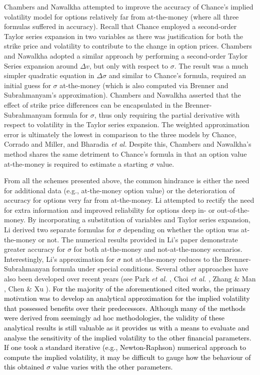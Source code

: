 Chambers and Nawalkha attempted to improve the accuracy of Chance's implied volatility model for options relatively far from at-the-money (where all three formulas suffered in accuracy). Recall that Chance employed a second-order Taylor series expansion in two variables as there was justification for both the strike price and volatility to contribute to the change in option prices. Chambers and Nawalkha adopted a similar approach by performing a second-order Taylor Series expansion around $\Delta v$, but only with respect to $\sigma$. The result was a much simpler quadratic equation in $\Delta \sigma$ and similar to Chance's formula, required an initial guess for $\sigma$ at-the-money (which is also computed via Brenner and Subrahmanyam's approximation). Chambers and Nawalkha asserted that the effect of strike price differences can be encapsulated in the Brenner-Subrahmanyam formula for $\sigma$, thus only requiring the partial derivative with respect to volatility in the Taylor series expansion. The weighted approximation error is ultimately the lowest in comparison to the three models by Chance, Corrado and Miller, and Bharadia \emph{et al.} Despite this, Chambers and Nawalkha's method shares the same detriment to Chance's formula in that an option value at-the-money is required to estimate a starting $\sigma$ value.

From all the schemes presented above, the common hindrance is either the need for additional data (e.g., at-the-money option value) or the deterioration of accuracy for options very far from at-the-money. Li \cite{SLi2005} attempted to rectify the need for extra information and improved reliability for options deep in- or out-of-the-money. By incorporating a substitution of variables and Taylor series expansion, Li derived two separate formulas for $\sigma$ depending on whether the option was at-the-money or not. The numerical results provided in Li's paper demonstrate greater accuracy for $\sigma$ for both at-the-money and not-at-the-money scenarios. Interestingly, Li's approximation for $\sigma$ not at-the-money reduces to the Brenner-Subrahmanyan formula under special conditions. Several other approaches have also been developed over recent years (see Park \emph{et al.} \cite{Park2011}, Choi \emph{et al.} \cite{Choi2011}, Zhang \& Man \cite{Zhang2014}, Chen \& Xu \cite{Chen2014}).
\textcolor{black}{
For the majority of the aforementioned cited works, the primary motivation was to develop an analytical approximation for the implied volatility that possessed benefits over their predecessors. Although many of the methods were derived from seemingly ad hoc methodologies, the validity of these analytical results is still valuable as it provides us with a means to evaluate and analyse the sensitivity of the implied volatility to the other financial parameters. If one took a standard iterative (e.g., Newton-Raphson) numerical approach to compute the implied volatility, it may be difficult to gauge how the behaviour of this obtained $\sigma$ value varies with the other parameters.}
		
